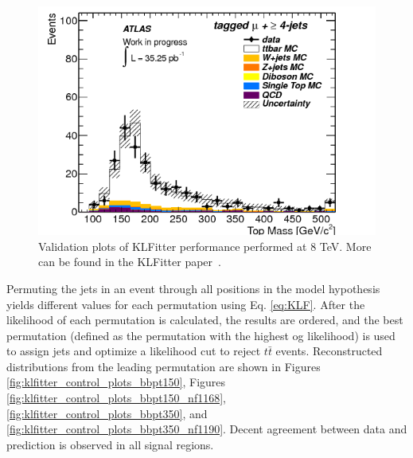 \begin{figure}[!hb]
\begin{center}
                \includegraphics[width=.47\textwidth]{figures/kinFit_appendix/validation/TopMass_mu}
	\caption{Validation plots of KLFitter performance performed at 8 TeV. More can be found in the KLFitter paper~\cite{klfitter}.}
	\label{fig:KLF_validation}
	\end{center}    
	\end{figure}

Permuting the jets in an event through all positions in the model hypothesis yields different values for each permutation using Eq. \ref{eq:KLF}. After the likelihood of each permutation is calculated, the results are ordered, and the best permutation (defined as the permutation with the highest og likelihood) is used to assign jets and optimize a likelihood cut to reject $t\bar{t}$ events. Reconstructed distributions from the leading permutation are shown in Figures \ref{fig:klfitter_control_plots_bbpt150}, Figures \ref{fig:klfitter_control_plots_bbpt150_nf1168}, \ref{fig:klfitter_control_plots_bbpt350}, and \ref{fig:klfitter_control_plots_bbpt350_nf1190}. Decent agreement between data and prediction is observed in all signal regions.

